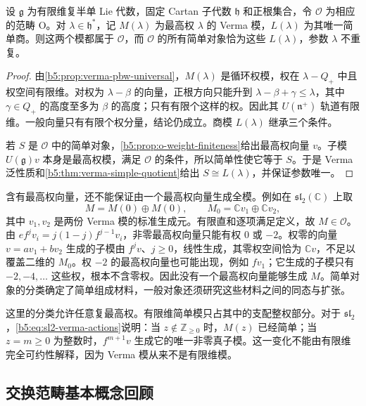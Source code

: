 \begin{proposition}\label{b5:prop:o-simple-objects}
	设 \(\mathfrak g\) 为有限维复半单 Lie 代数，固定 Cartan 子代数 \(\mathfrak h\) 和正根集合，令 \(\mathcal O\) 为相应的范畴 O。对 \(\lambda\in\mathfrak h^*\)，记 \(M(\lambda)\) 为最高权 \(\lambda\) 的 Verma 模，\(L(\lambda)\) 为其唯一简单商。则这两个模都属于 \(\mathcal O\)，而 \(\mathcal O\) 的所有简单对象恰为这些 \(L(\lambda)\)，参数 \(\lambda\) 不重复。
\end{proposition}
\begin{proof}
	由\cref{b5:prop:verma-pbw-universal}，\(M(\lambda)\) 是循环权模，权在 \(\lambda-Q_+\) 中且权空间有限维。对权为 \(\lambda-\beta\) 的向量，正根方向只能升到 \(\lambda-\beta+\gamma\le\lambda\)，其中 \(\gamma\in Q_+\) 的高度至多为 \(\beta\) 的高度；只有有限个这样的权。因此其 \(U(\mathfrak n^+)\) 轨道有限维。一般向量只有有限个权分量，结论仍成立。商模 \(L(\lambda)\) 继承三个条件。

	若 \(S\) 是 \(\mathcal O\) 中的简单对象，\cref{b5:prop:o-weight-finiteness}给出最高权向量 \(v\)。子模 \(U(\mathfrak g)v\) 本身是最高权模，满足 \(\mathcal O\) 的条件，所以简单性使它等于 \(S\)。于是 Verma 泛性质和\cref{b5:thm:verma-simple-quotient}给出 \(S\cong L(\lambda)\)，并保证参数唯一。
\end{proof}

含有最高权向量，还不能保证由一个最高权向量生成全模。例如在 \(\mathfrak{sl}_2(\mathbb C)\) 上取
\[
	M=M(0)\oplus M(0),\qquad M_0=\mathbb Cv_1\oplus\mathbb Cv_2,
\]
其中 \(v_1,v_2\) 是两份 Verma 模的标准生成元。有限直和逐项满足定义，故 \(M\in\mathcal O\)。由 \(ef^jv_i=j(1-j)f^{j-1}v_i\)，非零最高权向量只能有权 \(0\) 或 \(-2\)。权零的向量 \(v=av_1+bv_2\) 生成的子模由 \(f^jv\)、\(j\ge0\)，线性生成，其零权空间恰为 \(\mathbb Cv\)，不足以覆盖二维的 \(M_0\)。权 \(-2\) 的最高权向量也可能出现，例如 \(fv_1\)；它生成的子模只有 \(-2,-4,\ldots\) 这些权，根本不含零权。因此没有一个最高权向量能够生成 \(M\)。简单对象的分类确定了简单组成材料，一般对象还须研究这些材料之间的同态与扩张。

\ProseParagraphBreak

这里的分类允许任意复最高权。有限维简单模只占其中的支配整权部分。对于 \(\mathfrak{sl}_2\)，\eqref{b5:eq:sl2-verma-actions}说明：当 \(z\notin\mathbb Z_{\ge0}\) 时，\(M(z)\) 已经简单；当 \(z=m\ge0\) 为整数时，\(f^{m+1}v\) 生成它的唯一非零真子模。这一变化不能由有限维完全可约性解释，因为 Verma 模从来不是有限维模。

\subsection{交换范畴基本概念回顾}
\label{b5:subsec:2001:03}

